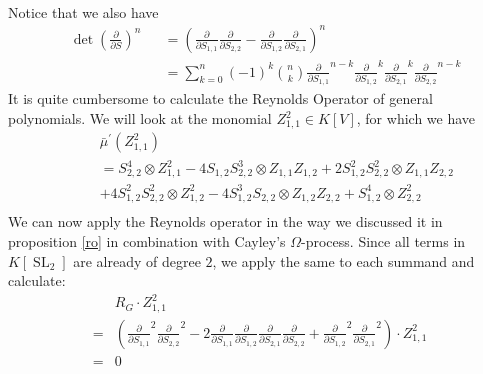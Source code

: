 \begin{example}
\begin{equation}
\begin{aligned}
    \end{aligned}
  \end{equation}
  Notice that we also have
  \begin{equation}
    \begin{aligned}
      &\operatorname{det}\left( \frac{\partial}{\partial S} \right)^n
      &&= \left( \frac{\partial}{\partial S_{1,1}} \frac{\partial}{\partial S_{2,2}} - \frac{\partial}{\partial S_{1,2}} \frac{\partial}{\partial S_{2,1}} \right)^n \\
      &&&= \sum_{k=0}^n (-1)^k \binom{n}{k} \frac{\partial}{\partial S_{1,1}}^{n-k} \frac{\partial}{\partial S_{1,2}}^k \frac{\partial}{\partial S_{2,1}}^k \frac{\partial}{\partial S_{2,2}}^{n-k}
    \end{aligned}
  \end{equation}
  It is quite cumbersome to calculate the Reynolds Operator of general polynomials.
  We will look at the monomial $Z_{1,1}^2 \in K[V]$, for which we have
  \begin{equation}
    \begin{aligned}
      &&&\bar{\mu}^\prime (Z_{1,1}^2) \\
      &&&= S_{2,2}^4 \otimes Z_{1,1}^2 - 4S_{1,2}S_{2,2}^3 \otimes Z_{1,1}Z_{1,2} + 2S_{1,2}^2 S_{2,2}^2 \otimes Z_{1,1}Z_{2,2} \\
      &&& + 4S_{1,2}^2 S_{2,2}^2 \otimes Z_{1,2}^2 - 4S_{1,2}^3 S_{2,2} \otimes Z_{1,2}Z_{2,2} + S_{1,2}^4 \otimes Z_{2,2}^2\\
    \end{aligned}
  \end{equation}
  We can now apply the Reynolds operator in the way we discussed it in proposition \ref{ro} in combination with Cayley's $\Omega$-process.
  Since all terms in $K[\operatorname{SL}_2]$ are already of degree $2$, we apply the same to each summand and calculate:
  \begin{equation}
    \begin{aligned}
      & R_G \cdot Z_{1,1}^2 \\
      =& \left( \frac{\partial}{\partial S_{1,1}}^2 \frac{\partial}{\partial S_{2,2}}^2 - 2 \frac{\partial}{\partial S_{1,1}} \frac{\partial}{\partial S_{1,2}} \frac{\partial}{\partial S_{2,1}} \frac{\partial}{\partial S_{2,2}} + \frac{\partial}{\partial S_{1,2}}^2\frac{\partial}{\partial S_{2,1}}^2 \right) \cdot Z_{1,1}^2 \\
      =& 0
    \end{aligned}
  \end{equation}

\end{example}

